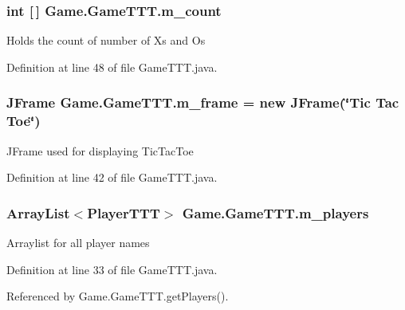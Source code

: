 \subsubsection[{m\+\_\+count}]{\setlength{\rightskip}{0pt plus 5cm}int \mbox{[}$\,$\mbox{]} Game.\+Game\+T\+T\+T.\+m\+\_\+count\hspace{0.3cm}{\ttfamily [private]}}\label{class_game_1_1_game_t_t_t_a79f50cdad0e0978bb30ac4ba2a96a971}
Holds the count of number of X\textquotesingle{}s and O\textquotesingle{}s 

Definition at line 48 of file Game\+T\+T\+T.\+java.

\hypertarget{class_game_1_1_game_t_t_t_a1ddfe813d586411f16504069d6bddf5d}{}
\subsubsection[{m\+\_\+frame}]{\setlength{\rightskip}{0pt plus 5cm}J\+Frame Game.\+Game\+T\+T\+T.\+m\+\_\+frame = new J\+Frame(\char`\"{}Tic Tac Toe\char`\"{})\hspace{0.3cm}{\ttfamily [private]}}\label{class_game_1_1_game_t_t_t_a1ddfe813d586411f16504069d6bddf5d}
J\+Frame used for displaying Tic\+Tac\+Toe 

Definition at line 42 of file Game\+T\+T\+T.\+java.

\hypertarget{class_game_1_1_game_t_t_t_aad75ff74595b7b58542d7060a77ca169}{}
\subsubsection[{m\+\_\+players}]{\setlength{\rightskip}{0pt plus 5cm}Array\+List$<${\bf Player\+T\+T\+T}$>$ Game.\+Game\+T\+T\+T.\+m\+\_\+players\hspace{0.3cm}{\ttfamily [private]}}\label{class_game_1_1_game_t_t_t_aad75ff74595b7b58542d7060a77ca169}
Arraylist for all player names 

Definition at line 33 of file Game\+T\+T\+T.\+java.



Referenced by Game.\+Game\+T\+T\+T.\+get\+Players().

\hypertarget{class_game_1_1_game_t_t_t_a6b2de64f05009047dd3a01867da865c0}{}
